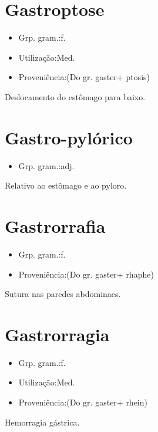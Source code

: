 \section{Gastroptose}
\begin{itemize}
\item {Grp. gram.:f.}
\end{itemize}
\begin{itemize}
\item {Utilização:Med.}
\end{itemize}
\begin{itemize}
\item {Proveniência:(Do gr. \textunderscore gaster\textunderscore  + \textunderscore ptosis\textunderscore )}
\end{itemize}
Deslocamento do estômago para baixo.
\section{Gastro-pylórico}
\begin{itemize}
\item {Grp. gram.:adj.}
\end{itemize}
Relativo ao estômago e ao pyloro.
\section{Gastrorrafia}
\begin{itemize}
\item {Grp. gram.:f.}
\end{itemize}
\begin{itemize}
\item {Proveniência:(Do gr. \textunderscore gaster\textunderscore  + \textunderscore rhaphe\textunderscore )}
\end{itemize}
Sutura nas paredes abdominaes.
\section{Gastrorragia}
\begin{itemize}
\item {Grp. gram.:f.}
\end{itemize}
\begin{itemize}
\item {Utilização:Med.}
\end{itemize}
\begin{itemize}
\item {Proveniência:(Do gr. \textunderscore gaster\textunderscore  + \textunderscore rhein\textunderscore )}
\end{itemize}
Hemorragia gástrica.
